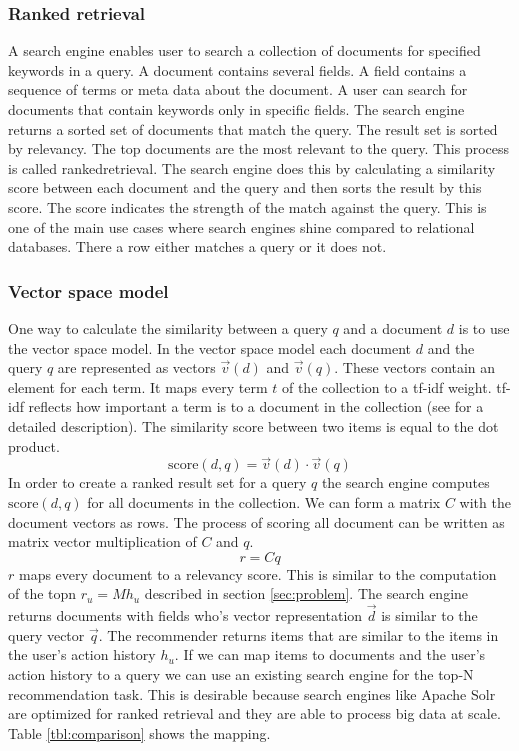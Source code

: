 \subsubsection{Ranked retrieval}
A search engine enables user to search a collection of documents for specified keywords in a query. A document contains several \glspl{field}. A \gls{field} contains a sequence of terms or meta data about the document. A user can search for documents that contain keywords only in specific fields. The search engine returns a sorted set of documents that match the query. The result set is sorted by relevancy. The top documents are the most relevant to the query. This process is called \gls{rankedretrieval}. The search engine does this by calculating a similarity score between each document and the query and then sorts the result by this score. The score indicates the strength of the match against the query. This is one of the main use cases where search engines shine compared to relational databases. There a row either matches a query or it does not. 

\subsubsection{Vector space model}
One way to calculate the similarity between a query $q$ and a document $d$ is to use the vector space model.
In the vector space model each document $d$ and the query $q$ are represented as vectors $\vec{v}(d)$ and $\vec{v}(q)$. These vectors contain an element for each term. It maps every term $t$ of the collection to a tf-idf weight. tf-idf reflects how important a term is to a document in the collection (see \cite{Manning} for a detailed description). 
The similarity score between two items is equal to the dot product.
\begin{equation}
  \label{eq:score}
  \text{score}(d,q) = \vec{v}(d) \cdot \vec{v}(q)
\end{equation}
In order to create a ranked result set for a query $q$ the search engine computes $\text{score}(d,q)$ for all documents in the collection. We can form a matrix $C$ with the document vectors as rows. The process of scoring all document can be written as matrix vector multiplication of $C$ and $q$. 
\begin{equation}
  \label{eq:ser}
  r = C q
\end{equation}
$r$ maps every document to a relevancy score.
This is similar to the computation of the \gls{topn} $r_u = M h_u$  described in section \ref{sec:problem}. The search engine returns documents with fields who's vector representation $\vec{d}$ is similar to the query vector $\vec{q}$. The recommender returns items that are similar to the items in the user's action history $h_u$. If we can map items to documents and the user's action history to a query we can use an existing search engine for the top-N recommendation task. This is desirable because search engines like Apache Solr are optimized for ranked retrieval and they are able to process big data at scale. Table \ref{tbl:comparison} shows the mapping. 

